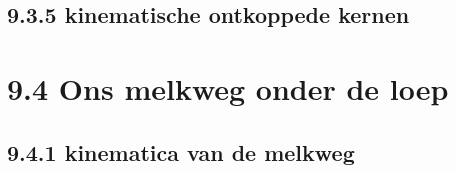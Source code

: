 \documentclass[10pt,a4paper]{article}
\begin{document}
\subsection*{9.3.5 kinematische ontkoppede kernen}

\section*{9.4 Ons melkweg onder de loep}
\subsection*{9.4.1 kinematica van de melkweg}
\end{document}
